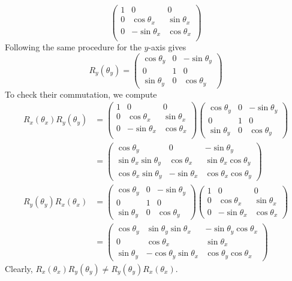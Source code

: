 \documentclass[../group-theory-in-a-nutshell-for-physicists.tex]{subfiles}
\begin{document}
\begin{questions}
\begin{solution}
\[\begin{pmatrix}
		1 & 0 & 0 \\
		0 & \cos\theta_{x} & \sin\theta_{x} \\
		0 & - \sin\theta_{x} & \cos\theta_{x} \\
		\end{pmatrix}
	\]
	Following the same procedure for the $y$-axis gives
	\[
		R_y(\theta_y) = \begin{pmatrix}
		\cos\theta_y & 0 & -\sin\theta_y \\
		0 & 1 & 0 \\
		\sin\theta_y & 0 & \cos\theta_y
		\end{pmatrix}
	\]
	To check their commutation, we compute
	\begin{align*}
		R_x(\theta_x)R_y(\theta_y) &= \begin{pmatrix}
		1 & 0 & 0 \\
		0 & \cos\theta_{x} & \sin\theta_{x} \\
		0 & - \sin\theta_{x} & \cos\theta_{x} \\
		\end{pmatrix}\begin{pmatrix}
		\cos\theta_y & 0 & -\sin\theta_y \\
		0 & 1 & 0 \\
		\sin\theta_y & 0 & \cos\theta_y
		\end{pmatrix} \\
		&= \begin{pmatrix}
		\cos\theta_y & 0 & -\sin\theta_y \\
		\sin\theta_x\sin\theta_y & \cos\theta_x & \sin\theta_x\cos\theta_y\\
		\cos\theta_x\sin\theta_y & -\sin\theta_x & \cos\theta_x\cos\theta_y
		\end{pmatrix} \\
		R_y(\theta_y)R_x(\theta_x) &= \begin{pmatrix}
			\cos\theta_y & 0 & -\sin\theta_y \\
			0 & 1 & 0 \\
			\sin\theta_y & 0 & \cos\theta_y
		\end{pmatrix}\begin{pmatrix}
		1 & 0 & 0 \\
		0 & \cos\theta_{x} & \sin\theta_{x} \\
		0 & - \sin\theta_{x} & \cos\theta_{x}
		\end{pmatrix} \\
		&= \begin{pmatrix}
			\cos\theta_y & \sin\theta_y\sin\theta_x & -\sin\theta_y\cos\theta_x \\
			0 & \cos\theta_x & \sin\theta_x \\
			\sin\theta_y & -\cos\theta_y\sin\theta_x & \cos\theta_y\cos\theta_x
		\end{pmatrix}
	\end{align*}
	Clearly, $R_x(\theta_x)R_y(\theta_y) \neq R_y(\theta_y)R_x(\theta_x)$.
\end{solution}


\end{questions}
\end{document}
